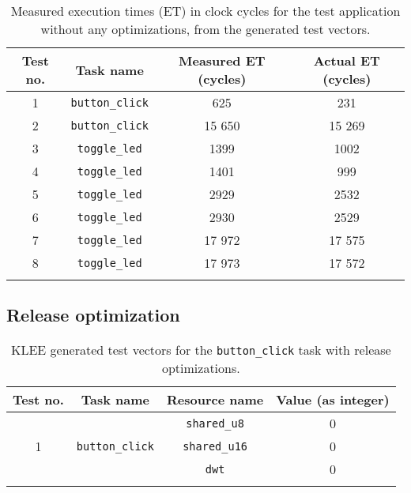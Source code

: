 \begin{longtable}{|c | c | c | c|}
    \hline
    Test no. & Task name & Measured ET (cycles) & Actual ET (cycles) \\ [0.5ex]
    \hline
    1 & \texttt{button\_click} & 625 & 231 \\
    \hline
    2 & \texttt{button\_click} & 15 650 & 15 269 \\
    \hline
    3 & \texttt{toggle\_led} & 1399 & 1002  \\
    \hline
    4 & \texttt{toggle\_led} & 1401  & 999 \\
    \hline
    5 & \texttt{toggle\_led} & 2929  & 2532 \\
    \hline
    6 & \texttt{toggle\_led} & 2930 & 2529 \\
    \hline
    7 & \texttt{toggle\_led} & 17 972 & 17 575 \\
    \hline
    8 & \texttt{toggle\_led} & 17 973 & 17 572 \\
    \hline
\caption{Measured execution times (ET) in clock cycles for the test application without any optimizations, from the generated test vectors.}
\label{tab:evaldebugmeasure}
\end{longtable}

\subsection{Release optimization}

\begin{longtable}{|c|c|c|c|}
\hline
Test no. & Task name & Resource name & Value (as integer) \\ \hline
\multirow{3}{*}{1} & \multirow{3}{*}{\texttt{button\_click}} & \texttt{shared\_u8}  & 0 \\ \cline{3-4} 
                   &                                         & \texttt{shared\_u16} & 0 \\ \cline{3-4} 
                   &                                         & \texttt{dwt}         & 0 \\ \hline
\caption{KLEE generated test vectors for the \texttt{button\_click} task with release optimizations.}
\label{tab:evalreleasetestsbutton}
\end{longtable}

